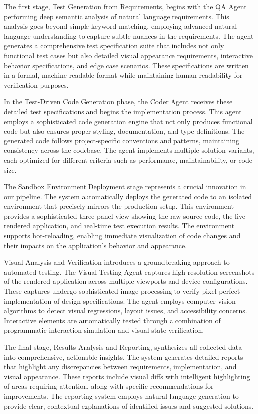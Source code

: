 \documentclass{lxaiproposal}
\begin{document}
The first stage, Test Generation from Requirements, begins with the QA Agent performing deep semantic analysis of natural language requirements. This analysis goes beyond simple keyword matching, employing advanced natural language understanding to capture subtle nuances in the requirements. The agent generates a comprehensive test specification suite that includes not only functional test cases but also detailed visual appearance requirements, interactive behavior specifications, and edge case scenarios. These specifications are written in a formal, machine-readable format while maintaining human readability for verification purposes.

In the Test-Driven Code Generation phase, the Coder Agent receives these detailed test specifications and begins the implementation process. This agent employs a sophisticated code generation engine that not only produces functional code but also ensures proper styling, documentation, and type definitions. The generated code follows project-specific conventions and patterns, maintaining consistency across the codebase. The agent implements multiple solution variants, each optimized for different criteria such as performance, maintainability, or code size.

The Sandbox Environment Deployment stage represents a crucial innovation in our pipeline. The system automatically deploys the generated code to an isolated environment that precisely mirrors the production setup. This environment provides a sophisticated three-panel view showing the raw source code, the live rendered application, and real-time test execution results. The environment supports hot-reloading, enabling immediate visualization of code changes and their impacts on the application's behavior and appearance.

Visual Analysis and Verification introduces a groundbreaking approach to automated testing. The Visual Testing Agent captures high-resolution screenshots of the rendered application across multiple viewports and device configurations. These captures undergo sophisticated image processing to verify pixel-perfect implementation of design specifications. The agent employs computer vision algorithms to detect visual regressions, layout issues, and accessibility concerns. Interactive elements are automatically tested through a combination of programmatic interaction simulation and visual state verification.

The final stage, Results Analysis and Reporting, synthesizes all collected data into comprehensive, actionable insights. The system generates detailed reports that highlight any discrepancies between requirements, implementation, and visual appearance. These reports include visual diffs with intelligent highlighting of areas requiring attention, along with specific recommendations for improvements. The reporting system employs natural language generation to provide clear, contextual explanations of identified issues and suggested solutions.
\end{document}
